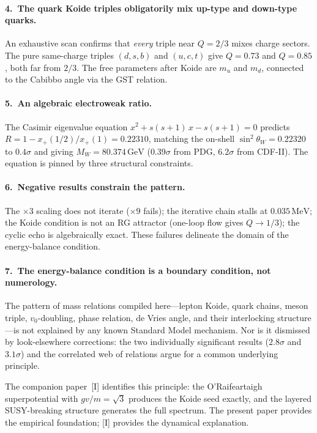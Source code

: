 \documentclass[12pt,a4paper]{article}
\newcommand{\MeV}{\,\text{MeV}}
\newcommand{\GeV}{\,\text{GeV}}
\begin{document}
\paragraph{4.\ The quark Koide triples obligatorily mix up-type
and down-type quarks.}
An exhaustive scan confirms that \emph{every} triple near $Q = 2/3$
mixes charge sectors. The pure same-charge triples $(d,s,b)$ and
$(u,c,t)$ give $Q = 0.73$ and $Q = 0.85$, both far from $2/3$.
The free parameters after Koide are $m_u$ and $m_d$, connected to
the Cabibbo angle via the GST relation.

\paragraph{5.\ An algebraic electroweak ratio.}
The Casimir eigenvalue equation $x^2 + s(s+1)\,x - s(s+1) = 0$
predicts $R = 1 - x_+(1/2)/x_+(1) = 0.22310$, matching the on-shell
$\sin^2\theta_W = 0.22320$ to $0.4\sigma$ and giving
$M_W = 80.374\GeV$ ($0.39\sigma$ from PDG, $6.2\sigma$ from CDF-II).
The equation is pinned by three structural constraints.

\paragraph{6.\ Negative results constrain the pattern.}
The $\times 3$ scaling does not iterate ($\times 9$ fails);
the iterative chain stalls at $0.035\MeV$; the Koide condition
is not an RG attractor (one-loop flow gives $Q \to 1/3$);
the cyclic echo is algebraically exact.
These failures delineate the domain of the energy-balance condition.

\paragraph{7.\ The energy-balance condition is a boundary condition,
not numerology.}
The pattern of mass relations compiled here---lepton Koide,
quark chains, meson triple, $v_0$-doubling, phase relation, de Vries
angle, and their interlocking structure---is not explained by any
known Standard Model mechanism. Nor is it dismissed by look-elsewhere
corrections: the two individually significant results ($2.8\sigma$
and $3.1\sigma$) and the correlated web of relations argue for a
common underlying principle.

The companion paper~[I] identifies this principle: the O'Raifeartaigh
superpotential with $gv/m = \sqrt{3}$ produces the Koide seed
exactly, and the layered SUSY-breaking structure generates the full
spectrum. The present paper provides the empirical foundation; [I]
provides the dynamical explanation.
\end{document}
